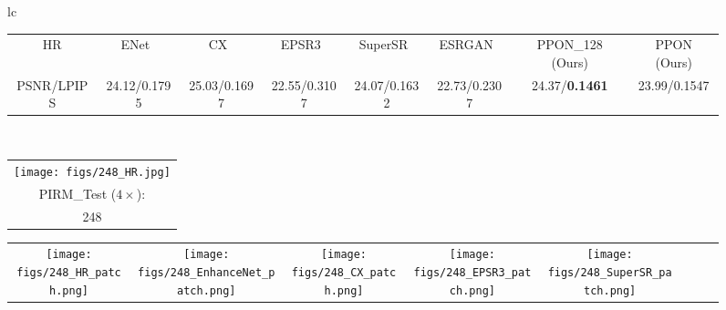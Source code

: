 \documentclass[preprint]{elsarticle}
\begin{document}
\begin{figure*}[htpb]
{\begin{tabular}{lc}
\begin{adjustbox}{valign=t}
\begin{tabular}{cccccccc}
					HR & \hspace{-3mm} ENet~\cite{EnhanceNet} & \hspace{-3mm} CX~\cite{CX} & \hspace{-3mm} EPSR3~\cite{EPSR} & 
					SuperSR~\cite{ESRGAN} & \hspace{-3mm} ESRGAN~\cite{ESRGAN} & \hspace{-3mm} PPON\_128 (Ours) & \hspace{-3mm} PPON (Ours) \\
					
					PSNR/LPIPS & \hspace{-3mm} 24.12/0.1795 & \hspace{-3mm} 25.03/0.1697 & \hspace{-3mm} 22.55/0.3107 &
					24.07/0.1632 & \hspace{-3mm} 22.73/0.2307 & \hspace{-3mm} 24.37/\textbf{0.1461} & \hspace{-3mm} 23.99/0.1547 \\
				\end{tabular}
			\end{adjustbox}
			\\
			\begin{adjustbox}{valign=t}
				\scriptsize
				\begin{tabular}{c}
					\texttt{[image: figs/248\_HR.jpg]} \\
					PIRM\_Test ($4 \times$): \\
					248 \\
				\end{tabular}
			\end{adjustbox}
			\hspace{-3mm}
			\begin{adjustbox}{valign=t}
				\scriptsize
				\begin{tabular}{cccccccc}
					\texttt{[image: figs/248\_HR\_patch.png]} &
					\hspace{-3mm}
					\texttt{[image: figs/248\_EnhanceNet\_patch.png]} &
					\hspace{-3mm}
					\texttt{[image: figs/248\_CX\_patch.png]} &
					\hspace{-3mm}
					\texttt{[image: figs/248\_EPSR3\_patch.png]} &
					\hspace{-3mm}					
					\texttt{[image: figs/248\_SuperSR\_patch.png]} &

\end{tabular}
\end{adjustbox}
\end{tabular}}
\end{figure*}
\end{document}

